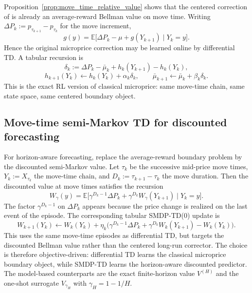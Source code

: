 \documentclass[11pt,twoside]{article}
\theoremstyle{plain}
\theoremstyle{definition}
\theoremstyle{remark}
\newcommand{\1}{\mathbf{1}}
\newcommand{\E}{\mathbb{E}}
\begin{document}
Proposition~\ref{prop:move_time_relative_value} shows that the centered correction of \cite{Petersen2025} is already an average-reward Bellman value on move time. Writing $\Delta P_k:=p_{\tau_{k+1}}-p_{\tau_k}$ for the move increment,
\begin{equation}\label{eq:move_time_relative_expectation}
g(y)=\E\bigl[\Delta P_k-\mu+g(Y_{k+1})\mid Y_k=y\bigr].
\end{equation}
Hence the original microprice correction may be learned online by differential TD. A tabular recursion is
\begin{equation}\label{eq:move_time_differential_td}
\delta_k:=\Delta P_k-\bar\mu_k+h_k(Y_{k+1})-h_k(Y_k),
\end{equation}
\begin{equation}\label{eq:move_time_differential_td_updates}
h_{k+1}(Y_k)\leftarrow h_k(Y_k)+\alpha_k\delta_k,
\qquad
\bar\mu_{k+1}\leftarrow \bar\mu_k+\beta_k\delta_k.
\end{equation}
This is the exact RL version of classical microprice: same move-time chain, same state space, same centered boundary object.

\subsection{Move-time semi-Markov TD for discounted forecasting}

For horizon-aware forecasting, replace the average-reward boundary problem by the discounted semi-Markov value. Let $\tau_k$ be the successive mid-price move times, $Y_k:=X_{\tau_k}$ the move-time chain, and $D_k:=\tau_{k+1}-\tau_k$ the move duration. Then the discounted value at move times satisfies the recursion
\begin{equation}\label{eq:smdp_bellman}
W_\gamma(y)=\E\bigl[\gamma^{D_k-1}\Delta P_k+\gamma^{D_k}W_\gamma(Y_{k+1})\mid Y_k=y\bigr].
\end{equation}
The factor $\gamma^{D_k-1}$ on $\Delta P_k$ appears because the price change is realized on the last event of the episode. The corresponding tabular SMDP-TD(0) update is
\begin{equation}\label{eq:smdp_td}
W_{k+1}(Y_k)
\leftarrow
W_k(Y_k)
+
\eta_k\bigl(\gamma^{D_k-1}\Delta P_k+\gamma^{D_k}W_k(Y_{k+1})-W_k(Y_k)\bigr).
\end{equation}
This uses the same move-time episodes as differential TD, but targets the discounted Bellman value rather than the centered long-run corrector. The choice is therefore objective-driven: differential TD learns the classical microprice boundary object, while SMDP-TD learns the horizon-aware discounted predictor. The model-based counterparts are the exact finite-horizon value $V^{(H)}$ and the one-shot surrogate $V_{\gamma_H}$ with $\gamma_H=1-1/H$.
\end{document}
